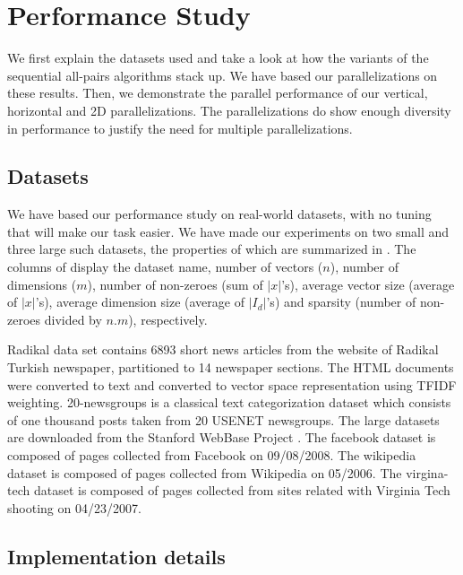 \documentclass{comjnl}
\begin{document}
\section{Performance Study}
\label{sec:perf}

We first explain the datasets used and take a look at how the variants
of the sequential all-pairs algorithms stack up. We have based our
parallelizations on these results.   Then, we demonstrate the parallel
performance of our vertical, horizontal and 2D parallelizations. The
parallelizations do show enough diversity in performance to justify
the need for multiple parallelizations.



\subsection{Datasets}

We have based our performance study on real-world datasets, with no
tuning that will make our task easier. We have made our experiments on
two small and three large such datasets, the properties of which are
summarized in . The columns of
 display the dataset name, number of vectors
($n$), number of dimensions ($m$), number of non-zeroes (sum of
$|x|$'s), average vector size (average of $|x|$'s), average dimension
size (average of $|I_d|$'s) and sparsity (number of non-zeroes divided
by $n.m$), respectively.

Radikal data set contains 6893 short news articles from the website of
Radikal Turkish newspaper, partitioned to 14 newspaper sections.  The
HTML documents were converted to text and converted to vector space
representation using TFIDF weighting.  20-newsgroups is a classical
text categorization dataset which consists of one thousand posts taken
from 20 USENET newsgroups.  The large datasets are downloaded from the
Stanford WebBase Project \cite{hirai2000}.  The facebook dataset is
composed of pages collected from Facebook on 09/08/2008. The wikipedia
dataset is composed of pages collected from Wikipedia on 05/2006. The
virgina-tech dataset is composed of pages collected from sites related
with Virginia Tech shooting on 04/23/2007.


\subsection{Implementation details}
\end{document}
